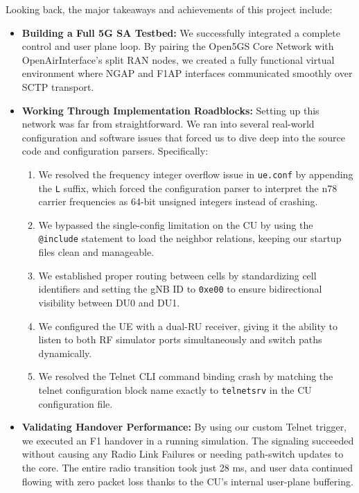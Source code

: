 Looking back, the major takeaways and achievements of this project include:
\begin{itemize}[leftmargin=*]
    \item \textbf{Building a Full 5G SA Testbed:} We successfully integrated a complete control and user plane loop. By pairing the Open5GS Core Network with OpenAirInterface's split RAN nodes, we created a fully functional virtual environment where NGAP and F1AP interfaces communicated smoothly over SCTP transport.
    
    \item \textbf{Working Through Implementation Roadblocks:} Setting up this network was far from straightforward. We ran into several real-world configuration and software issues that forced us to dive deep into the source code and configuration parsers. Specifically:
    \begin{enumerate}
        \item We resolved the frequency integer overflow issue in \texttt{ue.conf} by appending the \texttt{L} suffix, which forced the configuration parser to interpret the n78 carrier frequencies as 64-bit unsigned integers instead of crashing.
        \item We bypassed the single-config limitation on the CU by using the \texttt{@include} statement to load the neighbor relations, keeping our startup files clean and manageable.
        \item We established proper routing between cells by standardizing cell identifiers and setting the gNB ID to \texttt{0xe00} to ensure bidirectional visibility between DU0 and DU1.
        \item We configured the UE with a dual-RU receiver, giving it the ability to listen to both RF simulator ports simultaneously and switch paths dynamically.
        \item We resolved the Telnet CLI command binding crash by matching the telnet configuration block name exactly to \texttt{telnetsrv} in the CU configuration file.
    \end{enumerate}
    
    \item \textbf{Validating Handover Performance:} By using our custom Telnet trigger, we executed an F1 handover in a running simulation. The signaling succeeded without causing any Radio Link Failures or needing path-switch updates to the core. The entire radio transition took just 28 ms, and user data continued flowing with zero packet loss thanks to the CU's internal user-plane buffering.
\end{itemize}

